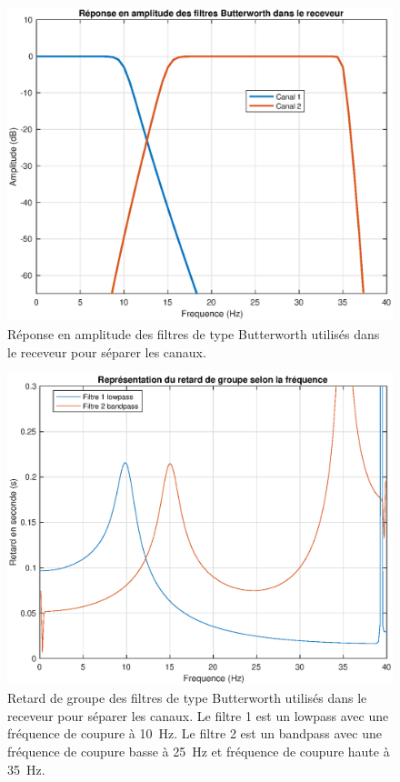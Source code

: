 \documentclass[10pt, oneside, a4paper]{article}
\begin{document}
\begin{figure}[htbp]
	\centering
	\includegraphics[height=0.4\textheight]{eps/filters.eps}
	\caption{Réponse en amplitude des filtres de type Butterworth utilisés dans le receveur
			 pour séparer les canaux.}
	\label{fig:filters}
\end{figure}

\begin{figure}[htbp]
	\centering
	\includegraphics[height=0.45\textheight]{eps/grpdelay.eps}
	\caption{Retard de groupe des filtres de type Butterworth utilisés dans le receveur
			 pour séparer les canaux.
			 Le filtre 1 est un lowpass avec une fréquence de coupure à \SI{10}{\hertz}.
			 Le filtre 2 est un bandpass avec une fréquence de coupure basse à
			 \SI{25}{\hertz} et fréquence de coupure haute à \SI{35}{\hertz}.}
	\label{fig:grpdelay}
\end{figure}
\end{document}

